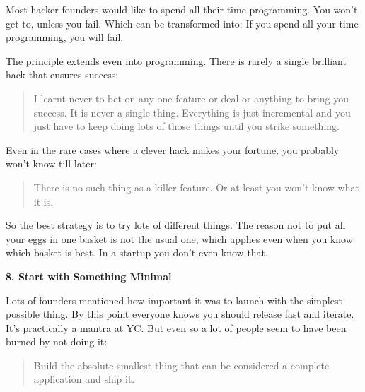                   Most hacker-founders would like to spend all their time
                  programming. You won't get to, unless you fail. Which can be
                  transformed into: If you spend all your time programming, you
                  will fail.

The principle extends even into
                  programming. There is rarely a single brilliant hack that
                  ensures success:
                  \begin{quote}

                    I learnt never to bet on any one feature or deal or anything
                    to bring you success. It is never a single thing. Everything
                    is just incremental and you just have to keep doing lots of
                    those things until you strike something.
                  
\end{quote}

                  Even in the rare cases where a clever hack makes your fortune,
                  you probably won't know till later:
                  \begin{quote}

                    There is no such thing as a killer feature. Or at least you
                    won't know what it is.
                  
\end{quote}

                  So the best strategy is to try lots of different things. The
                  reason not to put all your eggs in one basket is not the usual
                  one, which applies even when you know which basket is best. In
                  a startup you don't even know that.


                  \textbf{8. Start with Something Minimal}

Lots of
                  founders mentioned how important it was to launch with the
                  simplest possible thing. By this point everyone knows you
                  should release fast and iterate. It's practically a mantra at
                  YC. But even so a lot of people seem to have been burned by
                  not doing it:
                  \begin{quote}

                    Build the absolute smallest thing that can be considered a
                    complete application and ship it.
                  
\end{quote}


